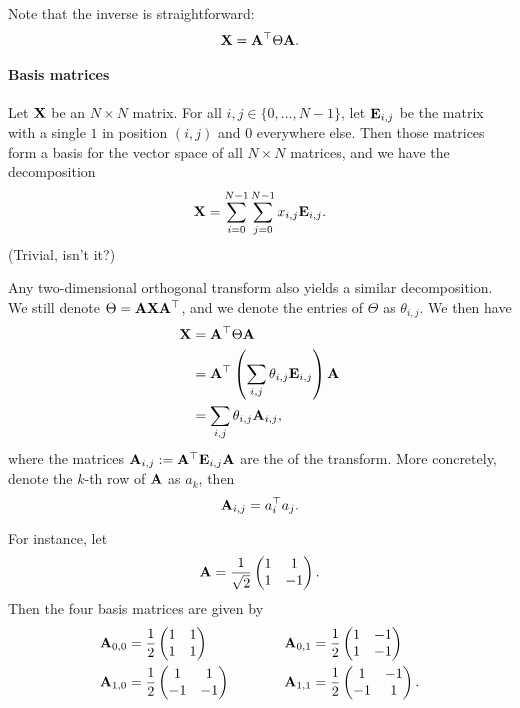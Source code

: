 \documentclass[a4paper, 11pt, openany]{book}
\begin{document}
Note that the inverse is straightforward:
\[
    {\bf X} = {\bf A}^\top \Theta {\bf A}.
\]

\paragraph{Basis matrices}
Let ${\bf X}$ be an $N \times N$ matrix. For all $i,j \in \{0, \dots, N-1\}$, let ${\bf E}_{i,j}$ be the matrix with a single $1$ in position $(i,j)$ and $0$ everywhere else. Then those matrices form a basis for the vector space of all $N \times N$ matrices, and we have the decomposition
\[
    {\bf X} = \sum_{i=0}^{N-1} \sum_{j=0}^{N-1} x_{i,j} {\bf E}_{i,j}.
\]
(Trivial, isn't it?)

Any two-dimensional orthogonal transform also yields a similar decomposition. We still denote $\Theta = {\bf A} {\bf X} {\bf A}^\top$, and we denote the entries of $\Theta$ as $\theta_{i,j}$. We then have
\begin{align*}
    {\bf X} &= {\bf A}^\top \Theta {\bf A}\\
            &= {\bf A}^\top \left( \sum_{i,j} \theta_{i,j} {\bf E}_{i,j} \right) {\bf A}\\
            &= \sum_{i,j} \theta_{i,j} {\bf A}_{i,j},
\end{align*}
where the matrices ${\bf A}_{i,j} := {\bf A}^\top {\bf E}_{i,j} {\bf A}$ are the  of the transform. More concretely, denote the $k$-th row of ${\bf A}$ as $a_k$, then
\[
    {\bf A}_{i,j} = a_i^\top a_j.
\]

For instance, let
\[
    {\bf A} =  \frac{1}{ \sqrt{2} }
    \begin{pmatrix}
    1 & 1\\
    1 & -1
    \end{pmatrix}.
\]
Then the four basis matrices are given by
\begin{alignat*}{3}
    {\bf A}_{0,0} &= \frac{1}{2}
    \begin{pmatrix}
    1 & 1\\
    1 & 1
    \end{pmatrix} &
    \qquad & &
    {\bf A}_{0,1} &= \frac{1}{2}
    \begin{pmatrix}
    1 & -1\\
    1 & -1
    \end{pmatrix} \\
    {\bf A}_{1,0} &= \frac{1}{2}
    \begin{pmatrix}
    1 & 1\\
    -1 & -1
    \end{pmatrix} &
    \qquad & &
    {\bf A}_{1,1} &= \frac{1}{2}
    \begin{pmatrix}
    1 & -1\\
    -1 & 1
    \end{pmatrix}.
\end{alignat*}
\end{document}
